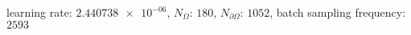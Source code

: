 learning rate: $\num[scientific-notation=true]{2.440738e-06}$, $N_{\Omega}$: $\num[scientific-notation=false]{180}$, $N_{\partial\Omega}$: $\num[scientific-notation=false]{1052}$, batch sampling frequency: $\num[scientific-notation=false]{2593}$